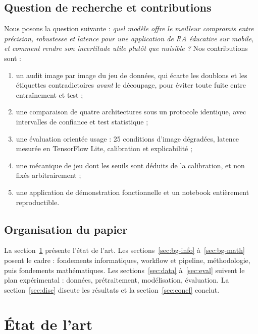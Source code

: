 \documentclass[conference]{IEEEtran}
\begin{document}
\subsection{Question de recherche et contributions}
Nous posons la question suivante : \emph{quel modèle offre le meilleur compromis entre précision, robustesse et latence pour une application de RA éducative sur mobile, et comment rendre son incertitude utile plutôt que nuisible ?} Nos contributions sont :
\begin{enumerate}
\item un audit image par image du jeu de données, qui écarte les doublons et les étiquettes contradictoires \emph{avant} le découpage, pour éviter toute fuite entre entraînement et test ;
\item une comparaison de quatre architectures sous un protocole identique, avec intervalles de confiance et test statistique ;
\item une évaluation orientée usage : 25 conditions d'image dégradées, latence mesurée en TensorFlow Lite, calibration et explicabilité ;
\item une mécanique de jeu dont les seuils sont déduits de la calibration, et non fixés arbitrairement ;
\item une application de démonstration fonctionnelle et un notebook entièrement reproductible.
\end{enumerate}

\subsection{Organisation du papier}
La section~\ref{sec:sota} présente l'état de l'art. Les sections~\ref{sec:bg-info} à~\ref{sec:bg-math} posent le cadre : fondements informatiques, workflow et pipeline, méthodologie, puis fondements mathématiques. Les sections~\ref{sec:data} à~\ref{sec:eval} suivent le plan expérimental : données, prétraitement, modélisation, évaluation. La section~\ref{sec:disc} discute les résultats et la section~\ref{sec:concl} conclut.

\section{État de l'art}\label{sec:sota}
\end{document}
